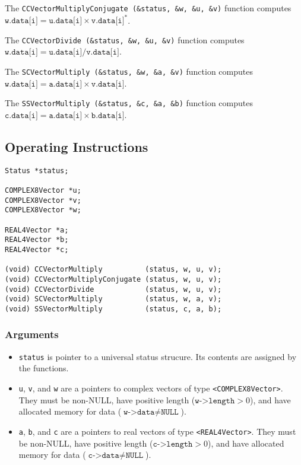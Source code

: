 \documentclass{article}
\begin{document}
The \verb:CCVectorMultiplyConjugate (&status, &w, &u, &v): function computes
$\texttt{w.data[i]}=\texttt{u.data[i]}\times\texttt{v.data[i]}^\ast$.

The \verb:CCVectorDivide (&status, &w, &u, &v): function computes
$\texttt{w.data[i]}=\texttt{u.data[i]}/\texttt{v.data[i]}$.

The \verb:SCVectorMultiply (&status, &w, &a, &v): function computes
$\texttt{w.data[i]}=\texttt{a.data[i]}\times\texttt{v.data[i]}$.

The \verb:SSVectorMultiply (&status, &c, &a, &b): function computes
$\texttt{c.data[i]}=\texttt{a.data[i]}\times\texttt{b.data[i]}$.

\subsection{Operating Instructions}


\begin{verbatim}
Status *status; 

COMPLEX8Vector *u;
COMPLEX8Vector *v;
COMPLEX8Vector *w;

REAL4Vector *a;
REAL4Vector *b;
REAL4Vector *c;

(void) CCVectorMultiply          (status, w, u, v);
(void) CCVectorMultiplyConjugate (status, w, u, v);
(void) CCVectorDivide            (status, w, u, v);
(void) SCVectorMultiply          (status, w, a, v);
(void) SSVectorMultiply          (status, c, a, b);
\end{verbatim}

\subsubsection{Arguments}


\begin{itemize}
\item \texttt{status} is pointer to a universal status strucure. Its contents
are assigned by the functions.
\item \texttt{u}, \texttt{v}, and \texttt{w} are a pointers to complex vectors
of type \texttt{<COMPLEX8Vector>}.  They must be non-NULL, have positive length
($\texttt{w->length}>0$), and have allocated memory for data
($\texttt{w->data}\neq\texttt{NULL}$).
\item \texttt{a}, \texttt{b}, and \texttt{c} are a pointers to real vectors
of type \texttt{<REAL4Vector>}.  They must be non-NULL, have positive length
($\texttt{c->length}>0$), and have allocated memory for data
($\texttt{c->data}\neq\texttt{NULL}$).
\end{itemize}
\end{document}
